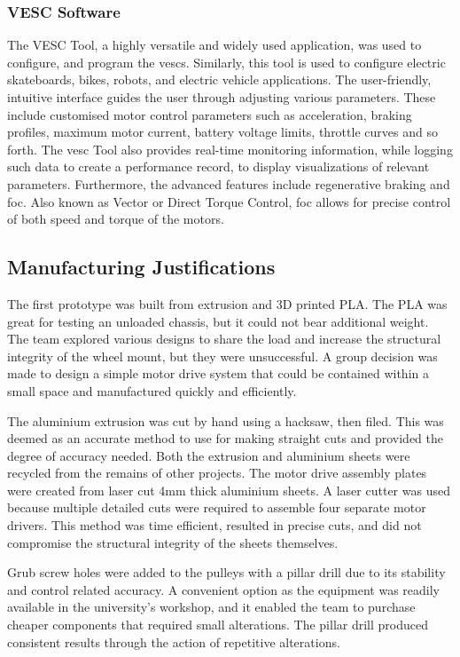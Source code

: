 \documentclass [12pt]{article}
\begin{document}
\subsubsection{VESC Software}
The VESC Tool, a highly versatile and widely used application, was used to configure, and program the \gls{vesc}s. Similarly, this tool is used to configure electric skateboards, bikes, robots, and electric vehicle applications. The user-friendly, intuitive interface guides the user through adjusting various parameters. These include customised motor control parameters such as acceleration, braking profiles, maximum motor current, battery voltage limits, throttle curves and so forth. The \gls{vesc} Tool also provides real-time monitoring information, while logging such data to create a performance record, to display visualizations of relevant parameters. Furthermore, the advanced features include regenerative braking and \gls{foc}. Also known as Vector or Direct Torque Control, \gls{foc} allows for precise control of both speed and torque of the motors.  

\subsection{Manufacturing Justifications}

The first prototype was built from extrusion and 3D printed PLA. The PLA was great for testing an unloaded chassis, but it could not bear additional weight. The team explored various designs to share the load and increase the structural integrity of the wheel mount, but they were unsuccessful. A group decision was made to design a simple motor drive system that could be contained within a small space and manufactured quickly and efficiently.  

The aluminium extrusion was cut by hand using a hacksaw, then filed. This was deemed as an accurate method to use for making straight cuts and provided the degree of accuracy needed. Both the extrusion and aluminium sheets were recycled from the remains of other projects. The motor drive assembly plates were created from laser cut 4mm thick aluminium sheets. A laser cutter was used because multiple detailed cuts were required to assemble four separate motor drivers. This method was time efficient, resulted in precise cuts, and did not compromise the structural integrity of the sheets themselves.  

Grub screw holes were added to the pulleys with a pillar drill due to its stability and control related accuracy. A convenient option as the equipment was readily available in the university’s workshop, and it enabled the team to purchase cheaper components that required small alterations. The pillar drill produced consistent results through the action of repetitive alterations. 
\end{document}
